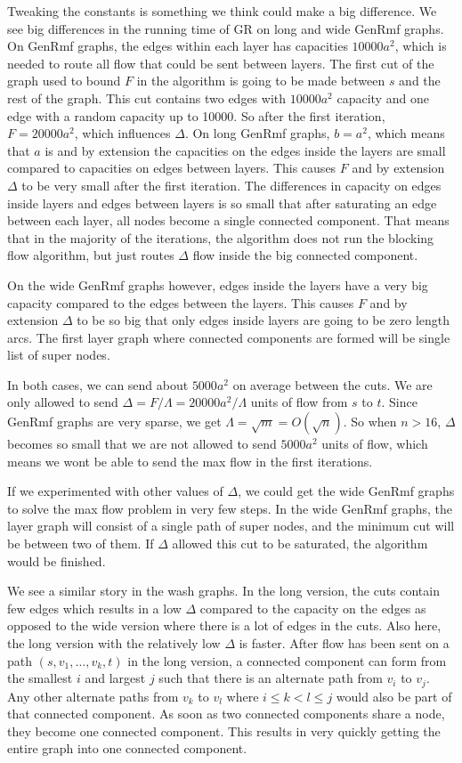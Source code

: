 Tweaking the constants is something we think could make a big difference.
We see big differences in the running time of GR on long and wide GenRmf graphs.
On GenRmf graphs, the edges within each layer has capacities $10000a^2$, which is needed to route all flow that could be sent between layers.
The first cut of the graph used to bound $F$ in the algorithm is going to be made between $s$ and the rest of the graph.
This cut contains two edges with $10000a^2$ capacity and one edge with a random capacity up to 10000.
So after the first iteration, $F=20000a^2$, which influences $\Delta$.
On long GenRmf graphs, $b=a^2$, which means that $a$ is and by extension the capacities on the edges inside the layers are small compared to capacities on edges between layers.
This causes $F$ and by extension $\Delta$ to be very small after the first iteration. 
The differences in capacity on edges inside layers and edges between layers is so small that after saturating an edge between each layer, all nodes become a single connected component.
That means that in the majority of the iterations, the algorithm does not run the blocking flow algorithm, but just routes $\Delta$ flow inside the big connected component.

On the wide GenRmf graphs however, edges inside the layers have a very big capacity compared to the edges between the layers.
This causes $F$ and by extension $\Delta$ to be so big that only edges inside layers are going to be zero length arcs.
The first layer graph where connected components are formed will be single list of super nodes.

In both cases, we can send about $5000a^2$ on average between the cuts. 
We are only allowed to send $\Delta = F/\Lambda = 20000a^2/\Lambda$ units of flow from $s$ to $t$.
Since GenRmf graphs are very sparse, we get $\Lambda=\sqrt{m}=O(\sqrt{n})$.
So when $n>16$, $\Delta$ becomes so small that we are not allowed to send $5000a^2$ units of flow, which means we wont be able to send the max flow in the first iterations.

If we experimented with other values of $\Delta$, we could get the wide GenRmf graphs to solve the max flow problem in very few steps.
In the wide GenRmf graphs, the layer graph will consist of a single path of super nodes, and the minimum cut will be between two of them.
If $\Delta$ allowed this cut to be saturated, the algorithm would be finished.
 
We see a similar story in the wash graphs. In the long version, the cuts contain few edges which results in a low $\Delta$ compared to the capacity on the edges 
as opposed to the wide version where there is a lot of edges in the cuts.
Also here, the long version with the relatively low $\Delta$ is faster.
After flow has been sent on a path $(s, v_1, \ldots, v_k, t)$ in the long version, a connected component can form from the smallest 
$i$ and largest $j$ such that there is an alternate path from $v_i$ to $v_j$.
Any other alternate paths from $v_k$ to $v_l$ where $i\leq k < l \leq j$ would also be part of that connected component.
As soon as two connected components share a node, they become one connected component.
This results in very quickly getting the entire graph into one connected component.

